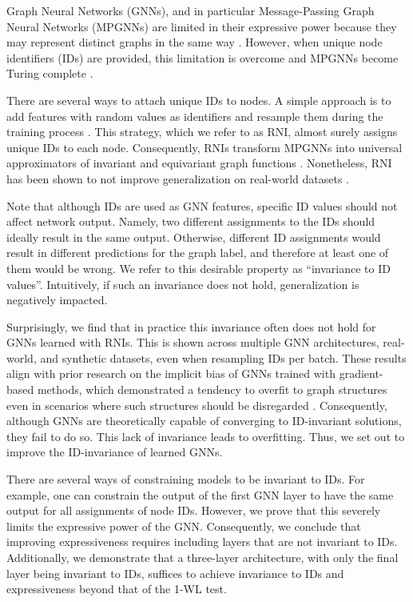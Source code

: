 Graph Neural Networks (GNNs), and in particular Message-Passing Graph Neural Networks (MPGNNs) \citep{morris2021weisfeiler} are limited in their expressive power because they may represent distinct graphs in the same way \citep{garg2020generalizationrepresentationallimitsgraph}. However, when unique node identifiers (IDs) are provided, this limitation is overcome and MPGNNs become Turing complete \citep{loukas2020graphneuralnetworkslearn, cyclesgnns}.

There are several ways to attach unique IDs to nodes. A simple approach is to add features with random values as identifiers and resample them during the training process \cite{sato2021randomfeaturesstrengthengraph, abboud2021surprisingpowergraphneural}. 
This strategy, which we refer to as RNI, almost surely assigns unique IDs to each node.
Consequently, RNIs transform MPGNNs into universal approximators of invariant and equivariant graph functions \cite{abboud2021surprisingpowergraphneural}.
Nonetheless, RNI has been shown to not improve generalization on real-world datasets \citep{murphy2019relational, you2021identity, gpse_canturk, eliasof2024granola, papp2021dropgnnrandomdropoutsincrease, bevilacqua2022equivariant, eliasof2023graph}.


Note that although IDs are used as GNN features, specific ID values should not affect network output. Namely, two different assignments to the IDs should ideally result in the same output. Otherwise, different ID assignments would result in different predictions for the graph label, and therefore at least one of them would be wrong. We refer to this desirable property as ``invariance to ID values''. Intuitively, if such an invariance does not hold, generalization is negatively impacted.

Surprisingly, we find that in practice this invariance often does not hold for GNNs learned with RNIs. This is shown across multiple GNN architectures, real-world, and synthetic datasets, even when resampling IDs per batch. 
These results align with prior research on the implicit bias of GNNs trained with gradient-based methods, which demonstrated a tendency to overfit to graph structures even in scenarios where such structures should be disregarded \cite{bechlerspeicher2024graphneuralnetworksuse}. Consequently, although GNNs are theoretically capable of converging to ID-invariant solutions, they fail to do so.
This lack of invariance leads to overfitting. 
Thus, we set out to improve the ID-invariance of learned GNNs. 


There are several ways of constraining models to be invariant to IDs. For example, one can constrain the output of the first GNN layer to have the same output for all assignments of node IDs. However, we prove that this severely limits the expressive power of the  GNN. Consequently, we conclude that improving expressiveness requires including layers that are not invariant to IDs. Additionally, we demonstrate that a three-layer architecture, with only the final layer being invariant to IDs, suffices to achieve invariance to IDs and expressiveness beyond that of the 1-WL test.



